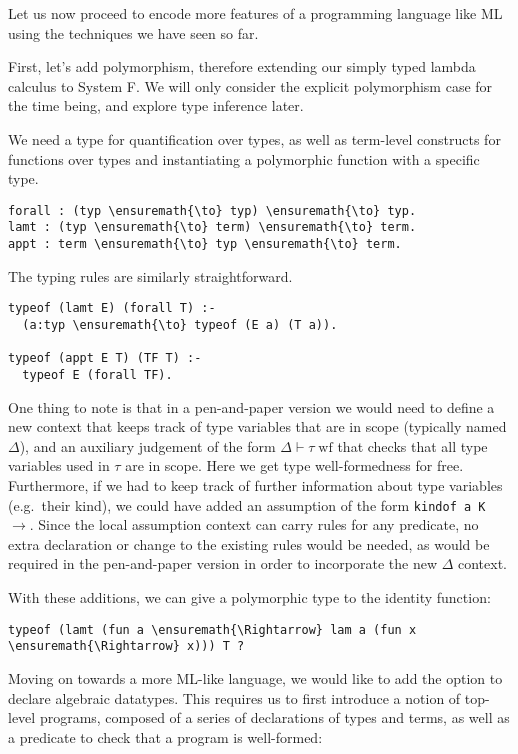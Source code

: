 Let us now proceed to encode more features of a programming language
like ML using the techniques we have seen so far.

First, let's add polymorphism, therefore extending our simply typed
lambda calculus to System F. We will only consider the explicit
polymorphism case for the time being, and explore type inference later.

We need a type for quantification over types, as well as term-level
constructs for functions over types and instantiating a polymorphic
function with a specific type.

\begin{verbatim}
forall : (typ \ensuremath{\to} typ) \ensuremath{\to} typ.
lamt : (typ \ensuremath{\to} term) \ensuremath{\to} term.
appt : term \ensuremath{\to} typ \ensuremath{\to} term.
\end{verbatim}

The typing rules are similarly straightforward.

\begin{verbatim}
typeof (lamt E) (forall T) :-
  (a:typ \ensuremath{\to} typeof (E a) (T a)).

typeof (appt E T) (TF T) :-
  typeof E (forall TF).
\end{verbatim}

One thing to note is that in a pen-and-paper version we would need to
define a new context that keeps track of type variables that are in
scope (typically named \(\Delta\)), and an auxiliary judgement of the
form \(\Delta \vdash \tau \; \text{wf}\) that checks that all type
variables used in \(\tau\) are in scope. Here we get type
well-formedness for free. Furthermore, if we had to keep track of
further information about type variables (e.g.~their kind), we could
have added an assumption of the form
\texttt{kindof\ a\ K\ \ensuremath{\to}}. Since the local assumption
context can carry rules for any predicate, no extra declaration or
change to the existing rules would be needed, as would be required in
the pen-and-paper version in order to incorporate the new \(\Delta\)
context.

With these additions, we can give a polymorphic type to the identity
function:

\begin{verbatim}
typeof (lamt (fun a \ensuremath{\Rightarrow} lam a (fun x \ensuremath{\Rightarrow} x))) T ?
\end{verbatim}

Moving on towards a more ML-like language, we would like to add the
option to declare algebraic datatypes. This requires us to first
introduce a notion of top-level programs, composed of a series of
declarations of types and terms, as well as a predicate to check that a
program is well-formed:


